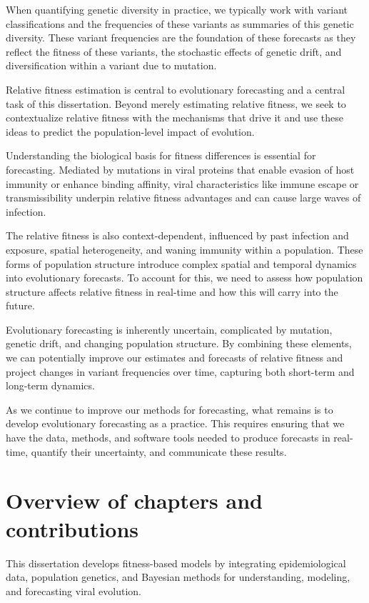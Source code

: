When quantifying genetic diversity in practice, we typically work with variant classifications and the frequencies of these variants as summaries of this genetic diversity.
These variant frequencies are the foundation of these forecasts as they reflect the fitness of these variants, the stochastic effects of genetic drift, and diversification within a variant due to mutation.

Relative fitness estimation is central to evolutionary forecasting and a central task of this dissertation.
Beyond merely estimating relative fitness, we seek to contextualize relative fitness with the mechanisms that drive it and use these ideas to predict the population-level impact of evolution.

Understanding the biological basis for fitness differences is essential for forecasting.
Mediated by mutations in viral proteins that enable evasion of host immunity or enhance binding affinity, viral characteristics like immune escape or transmissibility underpin relative fitness advantages and can cause large waves of infection.

The relative fitness is also context-dependent, influenced by past infection and exposure, spatial heterogeneity, and waning immunity within a population.
These forms of population structure introduce complex spatial and temporal dynamics into evolutionary forecasts.
To account for this, we need to assess how population structure affects relative fitness in real-time and how this will carry into the future.

Evolutionary forecasting is inherently uncertain, complicated by mutation, genetic drift, and changing population structure.
By combining these elements, we can potentially improve our estimates and forecasts of relative fitness and project changes in variant frequencies over time, capturing both short-term and long-term dynamics.

As we continue to improve our methods for forecasting, what remains is to develop evolutionary forecasting as a practice.
This requires ensuring that we have the data, methods, and software tools needed to produce forecasts in real-time, quantify their uncertainty, and communicate these results.

\section{Overview of chapters and contributions}

This dissertation develops fitness-based models by integrating epidemiological data, population genetics, and Bayesian methods for understanding, modeling, and forecasting viral evolution. 


